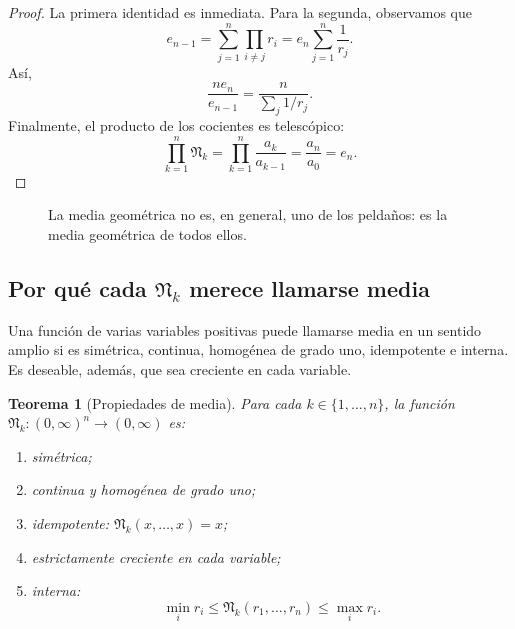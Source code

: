 \documentclass[11pt,oneside]{scrartcl}
\theoremstyle{plainblue}
\newtheorem{theorem}{Teorema}[section]
\theoremstyle{definitionblue}
\theoremstyle{remarkgray}
\newcommand{\AM}{\operatorname{AM}}
\newcommand{\GM}{\operatorname{GM}}
\newcommand{\HM}{\operatorname{HM}}
\newcommand{\cN}{\mathfrak{N}}
\begin{document}
\begin{proof}
La primera identidad es inmediata. Para la segunda, observamos que
\[
e_{n-1}=\sum_{j=1}^{n}\prod_{i\ne j}r_i
=e_n\sum_{j=1}^{n}\frac1{r_j}.
\]
Así,
\[
\frac{ne_n}{e_{n-1}}
=\frac{n}{\sum_j1/r_j}.
\]
Finalmente, el producto de los cocientes es telescópico:
\[
\prod_{k=1}^{n}\cN_k
=\prod_{k=1}^{n}\frac{a_k}{a_{k-1}}
=\frac{a_n}{a_0}=e_n.
\]
\end{proof}

\begin{figure}[ht]
\centering
{}
\caption{La media geométrica no es, en general, uno de los peldaños: es la media geométrica de todos ellos.}
\label{fig:newton-chain}
\end{figure}

\subsection[Por qué cada cociente merece llamarse media]{Por qué cada \(\cN_k\) merece llamarse media}

Una función de varias variables positivas puede llamarse media en un sentido amplio
si es simétrica, continua, homogénea de grado uno, idempotente e interna. Es deseable,
además, que sea creciente en cada variable.

\begin{theorem}[Propiedades de media]\label{thm:mean-properties}
Para cada \(k\in\{1,\dots,n\}\), la función \(\cN_k:(0,\infty)^n\to(0,\infty)\)
es:
\begin{enumerate}[label=\textup{(\roman*)}]
\item simétrica;
\item continua y homogénea de grado uno;
\item idempotente: \(\cN_k(x,\dots,x)=x\);
\item estrictamente creciente en cada variable;
\item interna:
\[
\min_i r_i\le\cN_k(r_1,\dots,r_n)\le\max_i r_i.
\]
\end{enumerate}
\end{theorem}
\end{document}
